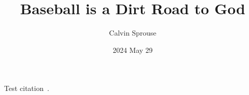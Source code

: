 \documentclass[a4paper, 12pt]{article}
\title{Baseball is a Dirt Road to God}
\author{Calvin Sprouse}
\affil{RELS 101 World Religions}
\date{2024 May 29}
\begin{document}
\maketitle

Test citation~\autocite{sexton_baseball_2013}.

\pagebreak
\printbibliography[title={Works Cited}]
\end{document}
